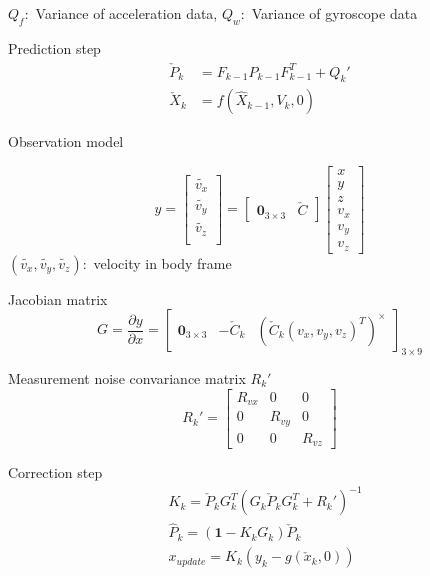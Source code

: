 \documentclass{cisXXX} %
\begin{document}
$Q_f: $ Variance of acceleration data, $Q_w: $ Variance of gyroscope data

Prediction step
\begin{equation}
\begin{split}
\check{P}_k &= F_{k-1}\hat{P}_{k-1}F_{k-1}^T+Q_k'  \\
\check{X}_k &= f(\hat{X}_{k-1},V_k,0)
\end{split}
\end{equation}

\newpage
Observation model

\begin{equation}
\renewcommand\arraystretch{1.2}
y=\begin{bmatrix}
\tilde{v_x}   \\
\tilde{v_y}   \\
\tilde{v_z}   \\
\end{bmatrix}=\begin{bmatrix}
\bm{0}_{3\times 3} & \check{C}
\end{bmatrix}\begin{bmatrix}
	x   \\
	y   \\
	z   \\
	v_x   \\
	v_y   \\
	v_z   
\end{bmatrix}
\end{equation}
$(\tilde{v_x},\tilde{v_y},\tilde{v_z}):$ velocity in body frame

Jacobian matrix
\begin{equation}
G=\frac{\partial y}{\partial x}=\begin{bmatrix}
\bm{0}_{3\times 3} & -\check{C}_k  &(\check{C}_k(v_x,v_y,v_z)^T)^{\times} 
\end{bmatrix}_{3\times 9}
\end{equation}

Measurement noise convariance matrix $R_k'$
\begin{equation}
R_k'=\begin{bmatrix}
R_{vx}  & 0   & 0 \\
0  & R_{vy}   & 0 \\
0  & 0   & R_{vz} 
\end{bmatrix}
\end{equation}

Correction step
\begin{equation}
\begin{split}
&K_k = \check{P}_k G_k^T\left(G_k\check{P}_k G_k^T + R_k'\right)^{-1}   \\
&\hat{P}_k  = (\bm{1}-K_k G_k)\check{P}_k  \\
&x_{update} = K_k(y_k-g(\check{x}_k,0)) 
\end{split}
\end{equation}
\end{document}
